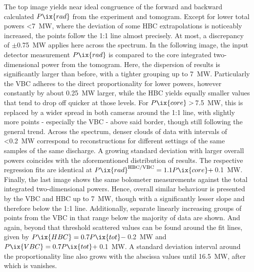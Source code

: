                 The top image yields near ideal congruence of the forward and backward calculated $P\ix{rad}$ from the experiment and tomogram. Except for lower total powers <\SI{7}{\mega\watt}, where the deviation of some HBC extrapolations is noticeably increased, the points follow the 1:1 line almost precisely. At most, a discrepancy of $\pm$\SI{0.75}{\mega\watt} applies here across the spectrum. In the following image, the input detector measurement $P\ix{rad}$ is compared to the core integrated two-dimensional power from the tomogram. Here, the dispersion of results is significantly larger than before, with a tighter grouping up to \SI{7}{\mega\watt}. Particularly the VBC adheres to the direct proportionality for lower powers, however constantly by about \SI{0.25}{\mega\watt} larger, while the HBC yields equally smaller values that tend to drop off quicker at those levels. For $P\ix{core}>$\,\SI{7.5}{\mega\watt}, this is replaced by a wider spread in both cameras around the 1:1 line, with slightly more points - especially the VBC - above said border, though still following the general trend. Across the spectrum, denser clouds of data with intervals of <\SI{0.2}{\mega\watt} correspond to reconstructions for different settings of the same samples of the same discharge. A growing standard deviation with larger overall powers coincides with the aforementioned distribution of results. The respective regression fits are identical at $P\ix{rad}^{\text{HBC/VBC}}=1.1P\ix{core}+$\,\SI{0.1}{\mega\watt}. Finally, the last image shows the same bolometer measurements against the total integrated two-dimensional powers. Hence, overall similar behaviour is presented by the VBC and HBC up to \SI{7}{\mega\watt}, though with a significantly lesser slope and therefore below the 1:1 line. Additionally, separate linearly increasing groups of points from the VBC in that range below the majority of data are shown. And again, beyond that threshold scattered values can be found around the fit lines, given by $P\ix{HBC}=0.7P\ix{tot}-$\,\SI{0.2}{\mega\watt} and $P\ix{VBC}=0.7P\ix{tot}+$\,\SI{0.1}{\mega\watt}. A standard deviation interval around the proportionality line also grows with the abscissa values until \SI{16.5}{\mega\watt}, after which is vanishes.\\%
